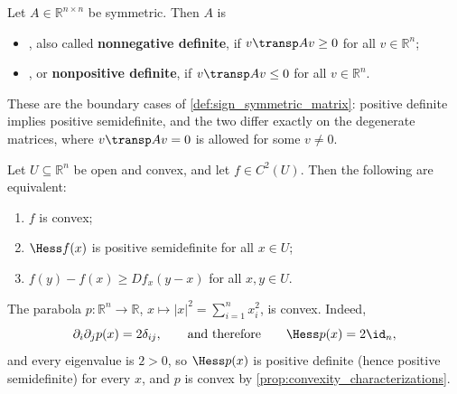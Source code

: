 \begin{definition}
\label{def:semidefinite_matrix}
Let $A \in \mathbb{R}^{n\times n}$ be symmetric. Then $A$ is
\begin{itemize}
  \item {} , also called
    \textbf{nonnegative definite}, if $v\transp Av \geq 0$ for all $v \in \mathbb{R}^n$;
  \item {} , or
    \textbf{nonpositive definite}, if $v\transp Av \leq 0$ for all $v \in \mathbb{R}^n$.
\end{itemize}
These are the boundary cases of \cref{def:sign_symmetric_matrix}: positive definite implies
positive semidefinite, and the two differ exactly on the degenerate matrices, where
$v\transp Av = 0$ is allowed for some $v \neq 0$.
\end{definition}


\begin{proposition}
\label{prop:convexity_characterizations}
Let $U \subseteq \mathbb{R}^n$ be open and convex, and let $f \in C^2(U)$. Then the following are
equivalent:
\begin{enumerate}[label=\textbf{(\alph*)}]
  \item $f$ is convex;
  \item $\Hess f(x)$ is positive semidefinite for all $x \in U$;
  \item $f(y)-f(x) \geq Df_x(y-x)$ for all $x,y \in U$.
\end{enumerate}
\end{proposition}

\begin{example}
The parabola $p : \mathbb{R}^n \to \mathbb{R}$, $x \mapsto |x|^2 = \sum_{i=1}^n x_i^2$, is convex. Indeed,
\[\partial_i\partial_j p(x) = 2\delta_{ij}, \qquad\text{and therefore}\qquad \Hess p(x) = 2\id_n,\]
and every eigenvalue is $2>0$, so $\Hess p(x)$ is positive definite (hence positive semidefinite)
for every $x$, and $p$ is convex by \cref{prop:convexity_characterizations}.
\end{example}

